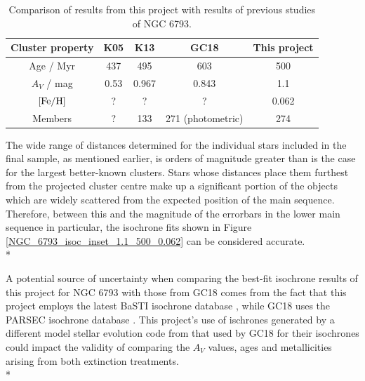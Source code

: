 \documentclass[12pt, a4paper]{report}
\begin{document}
\begin{table}
\begin{center}
\begin{tabular}{ccccc}
\hline
Cluster property & K05 & K13 & GC18 & This project \\
\hline
Age / Myr & 437 & 495 & 603 & 500 \\
$A_{V}$ / mag & 0.53 & 0.967 & 0.843 & 1.1 \\
$\textnormal{[Fe/H]}$ & ? & ? & ? & 0.062 \\
Members & ? & 133 & 271 (photometric) & 274 \\
\hline
\end{tabular}
\caption{Comparison of results from this project with results of previous studies of NGC 6793.}
\label{NGC6793_result}
\end{center}
\end{table}

The wide range of distances determined for the individual stars included in the final sample, as mentioned earlier, is orders of magnitude greater than is the case for the largest better-known clusters. Stars whose distances place them furthest from the projected cluster centre make up a significant portion of the objects which are widely scattered from the expected position of the main sequence. Therefore, between this and the magnitude of the errorbars in the lower main sequence in particular, the isochrone fits shown in Figure \ref{NGC_6793_isoc_inset_1.1_500_0.062} can be considered accurate. \\*

A potential source of uncertainty when comparing the best-fit isochrone results of this project for NGC 6793 with those from GC18 comes from the fact that this project employs the latest BaSTI isochrone database \citep{2018ApJ...856..125H}, while GC18 uses the PARSEC isochrone database \citep{2017ApJ...835...77M}. This project's use of ischrones generated by a different model stellar evolution code from that used by GC18 for their isochrones could impact the validity of comparing the $A_{V}$ values, ages and metallicities arising from both extinction treatments.\\*
\end{document}
